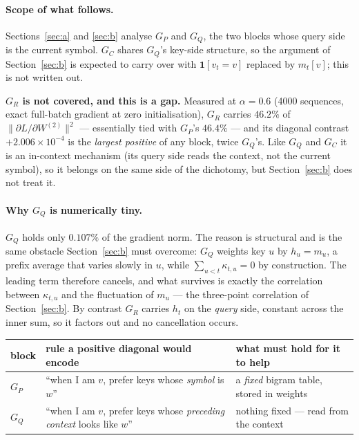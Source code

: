 \documentclass[11pt,a4paper]{article}
\theoremstyle{plain}
\theoremstyle{definition}
\newcommand{\1}{\mathbf{1}}
\begin{document}
\paragraph{Scope of what follows.}
Sections~\ref{sec:a} and \ref{sec:b} analyse $G_P$ and $G_Q$, the two blocks whose query side is
the current symbol. $G_C$ shares $G_Q$'s key-side structure, so the argument of Section~\ref{sec:b} is
expected to carry over with $\1[v_t{=}v]$ replaced by $m_t[v]$; this is not written out.

\textbf{$G_R$ is not covered, and this is a gap.} Measured at $\alpha=0.6$ (4000 sequences,
exact full-batch gradient at zero initialisation), $G_R$ carries $46.2\%$ of
$\lVert\partial L/\partial W^{(2)}\rVert^2$ --- essentially tied with $G_P$'s $46.4\%$ --- and its
diagonal contrast $+2.006\times10^{-4}$ is the \emph{largest positive} of any block, twice
$G_Q$'s. Like $G_Q$ and $G_C$ it is an in-context mechanism (its query side reads the context, not
the current symbol), so it belongs on the same side of the dichotomy, but Section~\ref{sec:b}
does not treat it.

\paragraph{Why $G_Q$ is numerically tiny.}
$G_Q$ holds only $0.107\%$ of the gradient norm. The reason is structural and is the same
obstacle Section~\ref{sec:b} must overcome: $G_Q$ weights key $u$ by $h_u=m_u$, a prefix average
that varies slowly in $u$, while $\sum_{u<t}\kappa_{t,u}=0$ by construction. The leading term
therefore cancels, and what survives is exactly the correlation between $\kappa_{t,u}$ and the
fluctuation of $m_u$ --- the three-point correlation of Section~\ref{sec:b}. By contrast $G_R$
carries $h_t$ on the \emph{query} side, constant across the inner sum, so it factors out and no
cancellation occurs.

\begin{center}
\begin{tabular}{@{}l>{\raggedright\arraybackslash}p{6.1cm}>{\raggedright\arraybackslash}p{5.4cm}@{}}
\toprule
block & rule a positive diagonal would encode & what must hold for it to help \\
\midrule
$G_P$ & ``when I am $v$, prefer keys whose \emph{symbol} is $w$''
      & a \emph{fixed} bigram table, stored in weights \\
$G_Q$ & ``when I am $v$, prefer keys whose \emph{preceding context} looks like $w$''
      & nothing fixed --- read from the context \\
\bottomrule
\end{tabular}
\end{center}
\end{document}
